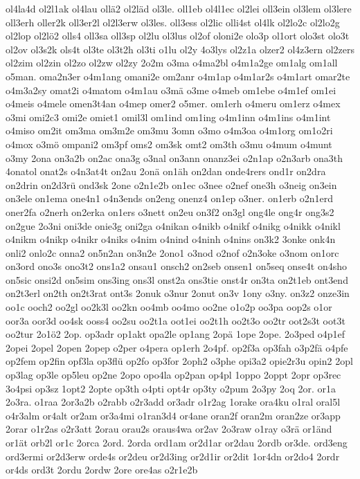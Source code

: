 {ol4la4d
ol2l1ak
ol4lau
ollä2
ol2läd
ol3le.
oll1eb
ol4l1ec
ol2lei
oll3ein
ol3lem
ol3lere
oll3erh
oller2k
oll3er2l
ol2l3erw
ol3les.
oll3ess
ol2lic
olli4st
ol4lk
ol2lo2c
ol2lo2g
ol2lop
ol2lö2
olls4
oll3sa
oll3sp
ol2lu
ol3lus
ol2of
oloni2e
olo3p
ol1ort
olo3st
olo3t
ol2ov
ol3s2k
ols4t
ol3te
ol3t2h
ol3ti
o1lu
ol2y
4o3lys
ol2z1a
olzer2
ol4z3ern
ol2zers
ol2zim
ol2zin
ol2zo
ol2zw
ol2zy
2o2m
o3ma
o4ma2bl
o4m1a2ge
om1alg
om1all
o5man.
oma2n3er
o4m1ang
omani2e
om2anr
o4m1ap
o4m1ar2s
o4m1art
omar2te
o4m3a2sy
omat2i
o4matom
o4m1au
o3mä
o3me
o4meb
om1ebe
o4m1ef
om1ei
o4meis
o4mele
omen3t4an
o4mep
omer2
o5mer.
om1erh
o4meru
om1erz
o4mex
o3mi
omi2c3
omi2e
omiet1
omil3l
om1ind
om1ing
o4m1inn
o4m1ins
o4m1int
o4miso
om2it
om3ma
om3m2e
om3mu
3omn
o3mo
o4m3oa
o4m1org
om1o2ri
o4mox
o3mö
ompani2
om3pf
oms2
om3sk
omt2
om3th
o3mu
o4mum
o4munt
o3my
2ona
on3a2b
on2ac
ona3g
o3nal
on3ann
onanz3ei
o2n1ap
o2n3arb
ona3th
4onatol
onat2s
o4n3at4t
on2au
2onä
on1äh
on2dan
onde4rers
ond1r
on2dra
on2drin
on2d3rü
ond3sk
2one
o2n1e2b
on1ec
o3nee
o2nef
one3h
o3neig
on3ein
on3ele
on1ema
one4n1
o4n3ends
on2eng
onenz4
on1ep
o3ner.
on1erb
o2n1erd
oner2fa
o2nerh
on2erka
on1ers
o3nett
on2eu
on3f2
on3gl
ong4le
ong4r
ong3s2
on2gue
2o3ni
oni3de
onie3g
oni2ga
o4nikan
o4nikb
o4nikf
o4nikg
o4nikk
o4nikl
o4nikm
o4nikp
o4nikr
o4niks
o4nim
o4nind
o4ninh
o4nins
on3k2
3onke
onk4n
onli2
onlo2c
onna2
on5n2an
on3n2e
2ono1
o3nod
o2nof
o2n3oke
o3nom
on1orc
on3ord
ono3s
ono3t2
ons1a2
onsau1
onsch2
on2seb
onsen1
on5seq
onse4t
on4sho
on5sic
onsi2d
on5sim
ons3ing
ons3l
onst2a
ons3tie
onst4r
on3ta
on2t1eb
ont3end
on2t3erl
on2th
on2t3rat
ont3s
2onuk
o3nur
2onut
on3v
1ony
o3ny.
on3z2
onze3in
oo1c
ooch2
oo2gl
oo2k3l
oo2kn
oo4mb
oo4mo
oo2ne
o1o2p
oo3pa
oop2s
o1or
oor3a
oor3d
oo4sk
ooss4
oo2su
oo2t1a
oot1ei
oo2t1h
oo2t3o
oo2tr
oot2s3t
oot3t
oo2tur
2o1ö2
2op.
op3adr
op1akt
opa2le
op1ang
2opä
1ope
2ope.
2o3ped
o4p1ef
2opei
2opel
2open
2opep
o2per
o4pera
op1erh
2o4pf.
op2f3a
op3fah
o3p2fä
o4pfe
op2fem
op2fin
opf3la
op3flü
op2fo
op3for
2oph2
o3phe
opi3a2
opie2r3u
opin2
2opl
op3lag
op3le
op5leu
op2ne
2opo
opo4la
op2pan
op4pl
1oppo
2oppt
2opr
op3rec
3o4psi
op3sz
1opt2
2opte
op3th
o4pti
opt4r
op3ty
o2pum
2o3py
2oq
2or.
or1a
2o3ra.
o1raa
2or3a2b
o2rabb
o2r3add
or3adr
o1r2ag
1orake
ora4ku
o1ral
oral5l
o4r3alm
or4alt
or2am
or3a4mi
o1ran3d4
or4ane
oran2f
oran2m
oran2ze
or3app
2orar
o1r2as
o2r3att
2orau
orau2s
oraus4wa
or2av
2o3raw
o1ray
o3rä
or1änd
or1ät
orb2l
or1c
2orca
2ord.
2orda
ord1am
or2d1ar
or2dau
2ordb
or3de.
ord3eng
ord3ermi
or2d3erw
orde4s
or2deu
or2d3ing
or2d1ir
or2dit
1or4dn
or2do4
2ordr
or4ds
ord3t
2ordu
2ordw
2ore
ore4as
o2r1e2b
}
